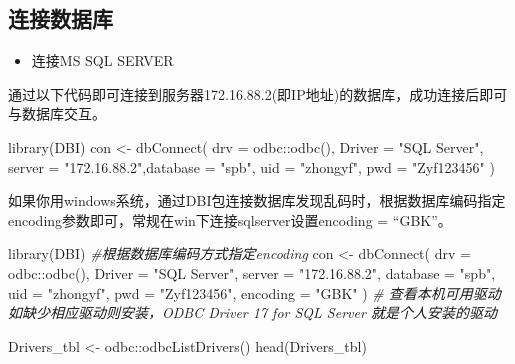 \documentclass[
]{book}
\newenvironment{Shaded}{\begin{snugshade}}{\end{snugshade}}
\newcommand{\AttributeTok}[1]{\textcolor[rgb]{0.77,0.63,0.00}{#1}}
\newcommand{\CommentTok}[1]{\textcolor[rgb]{0.56,0.35,0.01}{\textit{#1}}}
\newcommand{\FunctionTok}[1]{\textcolor[rgb]{0.00,0.00,0.00}{#1}}
\newcommand{\NormalTok}[1]{#1}
\newcommand{\OtherTok}[1]{\textcolor[rgb]{0.56,0.35,0.01}{#1}}
\newcommand{\SpecialCharTok}[1]{\textcolor[rgb]{0.00,0.00,0.00}{#1}}
\newcommand{\StringTok}[1]{\textcolor[rgb]{0.31,0.60,0.02}{#1}}
\providecommand{\tightlist}{%
  \setlength{\itemsep}{0pt}\setlength{\parskip}{0pt}}
\begin{document}
\hypertarget{ux8fdeux63a5ux6570ux636eux5e93}{%
\subsection{连接数据库}\label{ux8fdeux63a5ux6570ux636eux5e93}}

\begin{itemize}
\tightlist
\item
  连接MS SQL SERVER
\end{itemize}

通过以下代码即可连接到服务器172.16.88.2(即IP地址)的数据库，成功连接后即可与数据库交互。

\begin{Shaded}
\begin{Highlighting}[]
\FunctionTok{library}\NormalTok{(DBI)}
\NormalTok{con }\OtherTok{\textless{}{-}} \FunctionTok{dbConnect}\NormalTok{(}
  \AttributeTok{drv =}\NormalTok{ odbc}\SpecialCharTok{::}\FunctionTok{odbc}\NormalTok{(), }\AttributeTok{Driver =} \StringTok{"SQL Server"}\NormalTok{, }\AttributeTok{server =} \StringTok{"172.16.88.2"}\NormalTok{,}\AttributeTok{database =} \StringTok{"spb"}\NormalTok{, }\AttributeTok{uid =} \StringTok{"zhongyf"}\NormalTok{, }\AttributeTok{pwd =} \StringTok{"Zyf123456"}
\NormalTok{)}
\end{Highlighting}
\end{Shaded}

如果你用windows系统，通过DBI包连接数据库发现乱码时，根据数据库编码指定encoding参数即可，常规在win下连接sqlserver设置encoding = ``GBK''。

\begin{Shaded}
\begin{Highlighting}[]
\FunctionTok{library}\NormalTok{(DBI)}
\CommentTok{\#根据数据库编码方式指定encoding}
\NormalTok{con }\OtherTok{\textless{}{-}} \FunctionTok{dbConnect}\NormalTok{(}
  \AttributeTok{drv =}\NormalTok{ odbc}\SpecialCharTok{::}\FunctionTok{odbc}\NormalTok{(), }\AttributeTok{Driver =} \StringTok{"SQL Server"}\NormalTok{, }\AttributeTok{server =} \StringTok{"172.16.88.2"}\NormalTok{,}
  \AttributeTok{database =} \StringTok{"spb"}\NormalTok{, }\AttributeTok{uid =} \StringTok{"zhongyf"}\NormalTok{, }\AttributeTok{pwd =} \StringTok{"Zyf123456"}\NormalTok{, }\AttributeTok{encoding =} \StringTok{"GBK"}
\NormalTok{)}
\CommentTok{\# 查看本机可用驱动 如缺少相应驱动则安装，ODBC Driver 17 for SQL Server 就是个人安装的驱动}

\NormalTok{Drivers\_tbl }\OtherTok{\textless{}{-}}\NormalTok{ odbc}\SpecialCharTok{::}\FunctionTok{odbcListDrivers}\NormalTok{() }
\FunctionTok{head}\NormalTok{(Drivers\_tbl)}
\end{Highlighting}
\end{Shaded}
\end{document}
